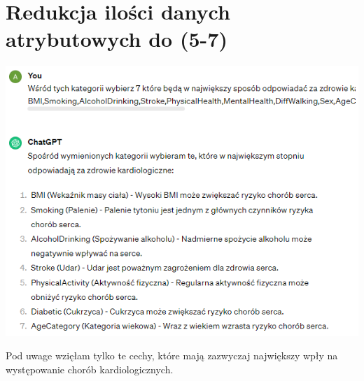 \documentclass[
]{article}
\begin{document}
\section{Redukcja ilości danych atrybutowych do
(5-7)}\label{redukcja-iloux15bci-danych-atrybutowych-do-5-7}

\includegraphics[width=1\linewidth]{ktore}

Pod uwage wzięłam tylko te cechy, które mają zazwyczaj największy wpły
na występowanie chorób kardiologicznych.
\end{document}
